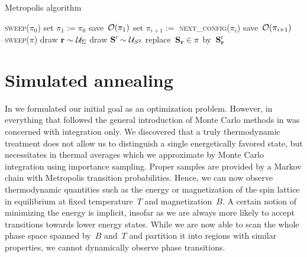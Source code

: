 \begin{algorithm}
  \caption{Metropolis algorithm}\label{alg:metropolis}
  \begin{algorithmic}[1]
    \Statex
     
       
        \State \textsc{sweep}($\pi_0$)
      \EndFor
      \State set $\pi_1 := \pi_0$
      \State save~$\mathcal{O}(\pi_1)$
        \State set $\pi_{i+1} :=$ \textsc{next\_config}($\pi_i$)
        \State save~$\mathcal{O}(\pi_{i+1})$
      \EndFor
    \EndProcedure
    \Statex
        \State \textsc{sweep}($\pi$)
      \EndFor
      \State \Return{$\pi$}
    \EndFunction
    \Statex
     
        \State draw $\mathbf{r} \sim \mathcal{U}_{\Sigma}$
        \State draw $\mathbf{S}' \sim \mathcal{U}_{S^2}$
            \State replace~$\mathbf{S}_{\mathbf{r}} \in \pi$ by~$\mathbf{S}'_{\mathbf{r}}$
        \EndIf
      \EndFor
    \EndProcedure
  \end{algorithmic}
\end{algorithm}

%
\section{Simulated annealing}\label{sec:siman}
%
In  we formulated our initial goal as an optimization problem.
However, in everything that followed the general introduction of Monte Carlo
methods in  was concerned with integration only. We
discovered that a truly thermodynamic treatment does not allow us to distinguish
a single energetically favored state, but necessitates in thermal averages which
we approximate by Monte Carlo integration using importance sampling. Proper
samples are provided by a Markov chain with Metropolis transition probabilities.
Hence, we can now observe thermodynamic quantities such as the energy or
magnetization of the spin lattice in equilibrium at fixed temperature~$T$ and
magnetization~$B$. A certain notion of minimizing the energy is implicit,
insofar as we are always more likely to accept transitions towards lower energy
states. While we are now able to scan the whole phase space spanned by~$B$
and~$T$ and partition it into regions with similar properties, we cannot
dynamically observe phase transitions.

